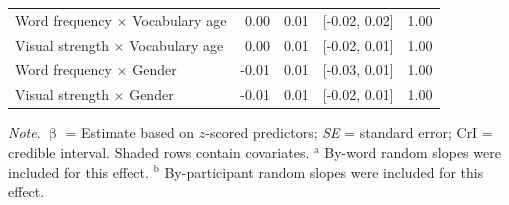 \documentclass[
  12pt,
  man,floatsintext]{apa7}
\begin{document}
\begin{table}[!h]
\begin{threeparttable}
\begin{tabular}[t]{lrrrr}
\hspace{1em}Word frequency  $\times$  Vocabulary age & 0.00 & 0.01 & {}[-0.02, 0.02] & 1.00\\
\hspace{1em}Visual strength  $\times$  Vocabulary age & 0.00 & 0.01 & {}[-0.02, 0.01] & 1.00\\
\hspace{1em}Word frequency  $\times$  Gender & -0.01 & 0.01 & {}[-0.03, 0.01] & 1.00\\
\hspace{1em}Visual strength  $\times$  Gender & -0.01 & 0.01 & {}[-0.02, 0.01] & 1.00\\
\bottomrule
\end{tabular}
\begin{tablenotes}
\item \textit{\linebreak} 
\item \textit{Note}. $\upbeta$ = Estimate based on $z$-scored predictors; \textit{SE} = standard error; \linebreak \phantom{.}CrI = credible interval. Shaded rows contain covariates. \linebreak \linebreak \phantom{.}$^{\text{a}}$ By-word random slopes were included for this effect. \linebreak \phantom{.}$^{\text{b}}$ By-participant random slopes were included for this effect.
\end{tablenotes}
\end{threeparttable}
\end{table}
\end{document}
